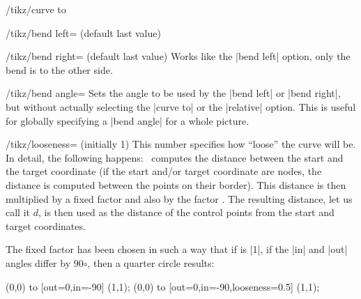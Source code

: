 \begin{key}{/tikz/curve to}
\begin{key}{/tikz/bend left= (default \normalfont last value)}
\begin{codeexample}[]
\end{codeexample}

\begin{codeexample}[]
\end{codeexample}
    \end{key}

    \begin{key}{/tikz/bend right= (default \normalfont last  value)}
        Works like the |bend left| option, only the bend is to the other side.
    \end{key}

    \begin{key}{/tikz/bend angle=}
        Sets the angle to be used by the |bend left| or |bend right|, but
        without actually selecting the |curve to| or the |relative| option.
        This is useful for globally specifying a |bend angle| for a whole
        picture.
    \end{key}

    \begin{key}{/tikz/looseness= (initially 1)}
        This number specifies how ``loose'' the curve will be. In detail, the
        following happens: \tikzname\ computes the distance between the start
        and the target coordinate (if the start and/or target coordinate are
        nodes, the distance is computed between the points on their border).
        This distance is then multiplied by a fixed factor and also by the
        factor . The resulting distance, let us call it $d$, is
        then used as the distance of the control points from the start and
        target coordinates.

        The fixed factor has been chosen in such a way that if  is
        |1|, if the |in| and |out| angles differ by 90$\circ$, then a quarter
        circle results:
\begin{codeexample}[]
\tikz \draw (0,0) to [out=0,in=-90]               (1,1);
\tikz \draw (0,0) to [out=0,in=-90,looseness=0.5] (1,1);
\end{codeexample}
    \end{key}


\end{key}
